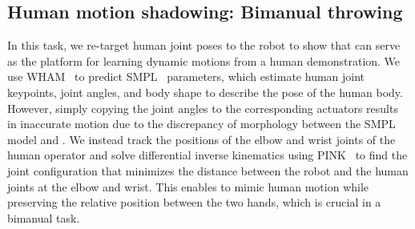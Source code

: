 



\subsection{Human motion shadowing: Bimanual throwing}
In this task, we re-target human joint poses to the robot to show that \robot can serve as the platform for learning dynamic motions from a human demonstration. We use WHAM~\cite{wham} to predict SMPL~\cite{smpl} parameters, which estimate human joint keypoints, joint angles, and body shape to describe the pose of the human body. However, simply copying the joint angles to the corresponding actuators results in inaccurate motion due to the discrepancy of morphology between the SMPL model and \robot. We instead track the positions of the elbow and wrist joints of the human operator and solve differential inverse kinematics using PINK~\cite{pink} to find the joint configuration that minimizes the distance between the robot and the human joints at the elbow and wrist. This enables \robot to mimic human motion while preserving the relative position between the two hands, which is crucial in a bimanual task. 

\begin{table}[hbt]
\centering
\caption{Box driving distance}
\label{tab:box_distance}
\end{table}

